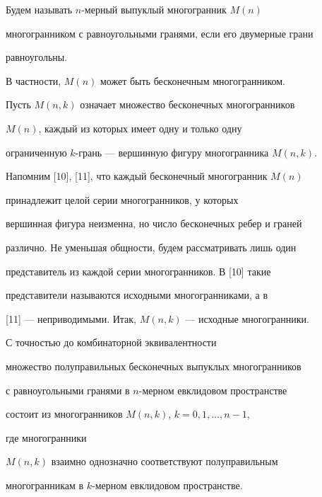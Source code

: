  


Будем называть $n$-мерный выпуклый многогранник $M(n)$ 


многогранником с равноугольными гранями, если его двумерные грани 


равноугольны. 


В частности, $M(n)$ может быть бесконечным многогранником.  


 


Пусть $M(n,k)$ означает множество бесконечных многогранников 


$M(n)$, каждый из которых имеет одну и только одну  


ограниченную $k$-грань --- вершинную фигуру многогранника $M(n,k)$. 


 


Напомним [10], [11], что каждый бесконечный многогранник $M(n)$ 


принадлежит целой серии многогранников, у которых 


вершинная фигура неизменна, но число бесконечных ребер и граней 


различно. Не уменьшая общности, будем рассматривать лишь один 


представитель из каждой серии многогранников. В [10] такие 


представители называются исходными многогранниками, а в  


[11] --- неприводимыми. Итак, $M(n,k)$ --- исходные многогранники.  


 


\begin{thm} С точностью до комбинаторной эквивалентности 


множество полуправильных бесконечных выпуклых многогранников 


с равноугольными гранями в $n$-мерном евклидовом пространстве  


состоит из многогранников $M(n,k)$, $k=0,1,\dotsc,n-1$, 


где многогранники 


$M(n,k)$ взаимно однозначно соответствуют полуправильным 


многогранникам в $k$-мерном евклидовом пространстве. 


\end{thm} 


 


